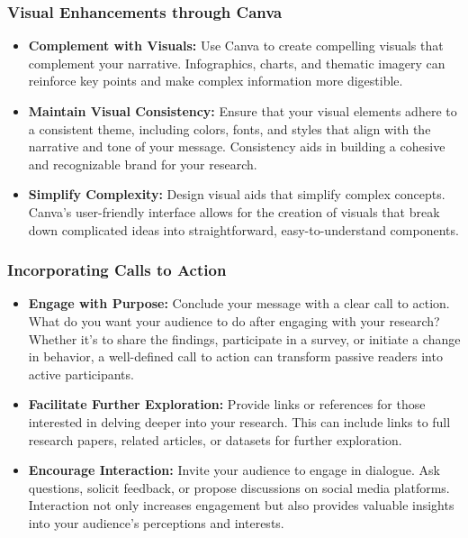 \documentclass[
]{book}
\begin{document}
\hypertarget{visual-enhancements-through-canva}{%
\subsubsection*{Visual Enhancements through Canva}\label{visual-enhancements-through-canva}}

\begin{itemize}
\item
  \textbf{Complement with Visuals:} Use Canva to create compelling visuals that complement your narrative. Infographics, charts, and thematic imagery can reinforce key points and make complex information more digestible.
\item
  \textbf{Maintain Visual Consistency:} Ensure that your visual elements adhere to a consistent theme, including colors, fonts, and styles that align with the narrative and tone of your message. Consistency aids in building a cohesive and recognizable brand for your research.
\item
  \textbf{Simplify Complexity:} Design visual aids that simplify complex concepts. Canva's user-friendly interface allows for the creation of visuals that break down complicated ideas into straightforward, easy-to-understand components.
\end{itemize}

\hypertarget{incorporating-calls-to-action}{%
\subsubsection*{Incorporating Calls to Action}\label{incorporating-calls-to-action}}

\begin{itemize}
\item
  \textbf{Engage with Purpose:} Conclude your message with a clear call to action. What do you want your audience to do after engaging with your research? Whether it's to share the findings, participate in a survey, or initiate a change in behavior, a well-defined call to action can transform passive readers into active participants.
\item
  \textbf{Facilitate Further Exploration:} Provide links or references for those interested in delving deeper into your research. This can include links to full research papers, related articles, or datasets for further exploration.
\item
  \textbf{Encourage Interaction:} Invite your audience to engage in dialogue. Ask questions, solicit feedback, or propose discussions on social media platforms. Interaction not only increases engagement but also provides valuable insights into your audience's perceptions and interests.
\end{itemize}
\end{document}
